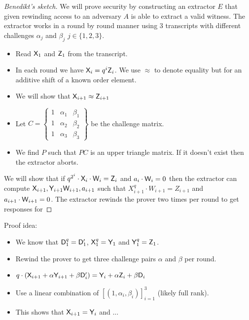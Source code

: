 \documentclass[12pt]{article}
\theoremstyle{Definition}
\begin{document}
	
	
	\begin{proof}[Benedikt's sketch]
	We will prove security by constructing an extractor $E$ that given rewinding access to an adversary $A$ is able to extract a valid witness. 
The extractor works in a round by round manner using $3$ transcripts with different challenges $\alpha_j$ and $\beta_j$ $j\in\{1,2,3\}$. 
 
\begin{itemize}
	\item Read $\mathsf{X}_1$ and $\mathsf{Z}_1$ from the transcript.
	\item In each round we have $\mathsf{X}_i = q^i \mathsf{Z}_i$. We use $\approx$ to denote equality but for an additive shift of a known order element.
	\item We will show that $\mathsf{X}_{i+1}\approx \mathsf{Z}_{i+1}$
	\item Let $C= \left\{\begin{array}{lll}
		1 & \alpha_1 & \beta_1\\
		1 & \alpha_2 & \beta_2\\
		1 & \alpha_3 & \beta_3
	\end{array}\right\} $ be the challenge matrix. 
	\item We find $P$ such that $P C$ is an upper triangle matrix. If it doesn't exist then the extractor aborts.
\end{itemize}
	We will show that if $q^{2^i}\cdot \mathsf{X}_i \cdot \mathsf{W}_i=\mathsf{Z}_i$ and $a_i \cdot \mathsf{W}_i=0$ then the extractor can compute $\mathsf{X}_{i+1},\mathsf{Y}_{i+1} \mathsf{W}_{i+1}, a_{i+1}$ such that $X_{i+1}^q\cdot W_{i+1}=Z_{i+1}$ and $a_{i+1}\cdot \mathsf{W}_{i+1}=0$.  
	The extractor rewinds the prover two times per round to get responses for  
	\end{proof}
	
	Proof idea:
	\begin{itemize}
		\item  We know that $\mathsf{D}_1^q=\mathsf{D}_1'$, $\mathsf{X}_1^q=\mathsf{Y}_1$ and $\mathsf{Y}_1^q=\mathsf{Z}_1$.
		\item Rewind the prover to get three challenge pairs $\alpha$ and $\beta$ per round.
		\item $q\cdot (\mathsf{X}_{i+1} +\alpha \mathsf{Y}_{i+1} +\beta \mathsf{D}_{i}')= \mathsf{Y}_{i} +\alpha \mathsf{Z}_{i} +\beta \mathsf{D}_{i}$
		\item Use a linear combination of $[(1,\alpha_i,\beta_i)]_{i=1}^3$ (likely full rank). 
		\item This shows that $\mathsf{X}_{i+1}= \mathsf{Y}_{i}$ and ...
	\end{itemize}
\end{document}
